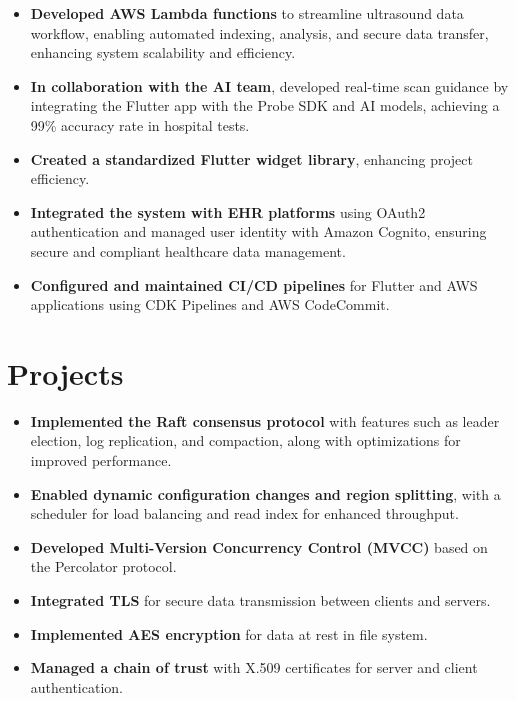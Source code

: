 \documentclass[10pt]{resume}
\begin{document}
\begin{itemize}
\item \textbf{Developed AWS Lambda functions} to streamline ultrasound data workflow, enabling automated indexing, analysis, and secure data transfer, enhancing system scalability and efficiency.
\item \textbf{In collaboration with the AI team}, developed real-time scan guidance by integrating the Flutter app with the Probe SDK and AI models, achieving a 99\% accuracy rate in hospital tests.
\item \textbf{Created a standardized Flutter widget library}, enhancing project efficiency.
\item \textbf{Integrated the system with EHR platforms} using OAuth2 authentication and managed user identity with Amazon Cognito, ensuring secure and compliant healthcare data management.
\item \textbf{Configured and maintained CI/CD pipelines} for Flutter and AWS applications using CDK Pipelines and AWS CodeCommit.
\end{itemize}



\section{Projects}
\begin{itemize}
\item \textbf{Implemented the Raft consensus protocol} with features such as leader election, log replication, and compaction, along with optimizations for improved performance.
\item \textbf{Enabled dynamic configuration changes and region splitting}, with a scheduler for load balancing and read index for enhanced throughput.
\item \textbf{Developed Multi-Version Concurrency Control (MVCC)} based on the Percolator protocol.
\end{itemize}

\begin{itemize}
\item \textbf{Integrated TLS} for secure data transmission between clients and servers.
\item \textbf{Implemented AES encryption} for data at rest in file system.
\item \textbf{Managed a chain of trust} with X.509 certificates for server and client authentication.
\end{itemize}
\end{document}
